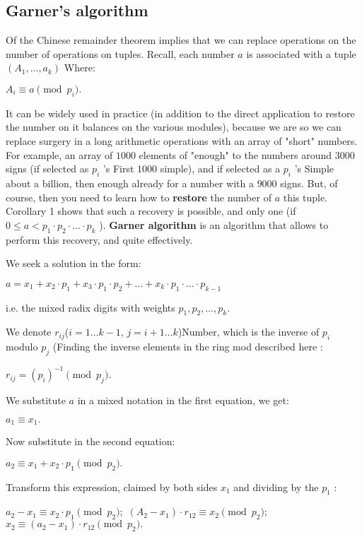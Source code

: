 \subsection{ Garner's algorithm }

Of the Chinese remainder theorem implies that we can replace operations on the number of operations on tuples. Recall, each number $a$ is associated with a tuple $(A_1, \ldots, a_k)$ Where:

${A_i \equiv a \pmod {p_i}}.$

It can be widely used in practice (in addition to the direct application to restore the number on it balances on the various modules), because we are so we can replace surgery in a long arithmetic operations with an array of "short" numbers. For example, an array of $1000$ elements of "enough" to the numbers around $3000$ signs (if selected as $p_i$ 's First $1000$ simple), and if selected as a $p_i$ 's Simple about a billion, then enough already for a number with a $9000$ signs. But, of course, then you need to learn how to \textbf{restore} the number of $a$ this tuple. Corollary 1 shows that such a recovery is possible, and only one (if $0 \le a <p_1 \cdot p_2 \cdot \ldots \cdot p_k$ ). \textbf{Garner algorithm} is an algorithm that allows to perform this recovery, and quite effectively.

We seek a solution in the form:

$a=x_{1}+x_{2}\cdot p_{1}+x_{3}\cdot p_{1}\cdot p_{2}+\ldots+x_{k}\cdot p_{1}\cdot\ldots\cdot p_{k-1}$

i.e. the mixed radix digits with weights $p_1, p_2, \ldots, p_k$.

We denote $r_ {ij}$($i = 1 \ldots k-1$, $j = i +1 \ldots k$)Number, which is the inverse of $p_i$ modulo $p_j$ (Finding the inverse elements in the ring mod described here :

$r_ {ij} = (p_i) ^ {-1} \pmod {p_j}.$

We substitute $a$ in a mixed notation in the first equation, we get:

$a_1 \equiv x_1.$

Now substitute in the second equation:

$a_2 \equiv x_1 + x_2 \cdot p_1 \pmod {p_2}.$

Transform this expression, claimed by both sides $x_1$ and dividing by the $p_1$ :

$a_2 - x_1 \equiv x_2 \cdot p_1 \pmod {p_2};$
$(A_2 - x_1) \cdot r_ {12} \equiv x_2 \pmod {p_2};$
$x_2 \equiv (a_2 - x_1) \cdot r_ {12} \pmod {p_2}.$

